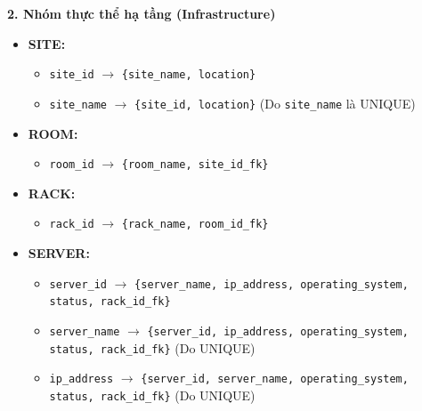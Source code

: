 {\textbf{2. Nhóm thực thể hạ tầng (Infrastructure)}
\begin{itemize}
    \item \textbf{SITE:}
    \begin{itemize}
        \item \texttt{site\_id} $\rightarrow$ \texttt{\{site\_name, location\}}
        \item \texttt{site\_name} $\rightarrow$ \texttt{\{site\_id, location\}} (Do \texttt{site\_name} là UNIQUE)
    \end{itemize}
    \item \textbf{ROOM:}
    \begin{itemize}
        \item \texttt{room\_id} $\rightarrow$ \texttt{\{room\_name, site\_id\_fk\}}
    \end{itemize}
    \item \textbf{RACK:}
    \begin{itemize}
        \item \texttt{rack\_id} $\rightarrow$ \texttt{\{rack\_name, room\_id\_fk\}}
    \end{itemize}
    \item \textbf{SERVER:}
    \begin{itemize}
        \item \texttt{server\_id} $\rightarrow$ \texttt{\{server\_name, ip\_address, operating\_system, status, rack\_id\_fk\}}
        \item \texttt{server\_name} $\rightarrow$ \texttt{\{server\_id, ip\_address, operating\_system, status, rack\_id\_fk\}} (Do UNIQUE)
        \item \texttt{ip\_address} $\rightarrow$ \texttt{\{server\_id, server\_name, operating\_system, status, rack\_id\_fk\}} (Do UNIQUE)
    \end{itemize}
\end{itemize}

}

